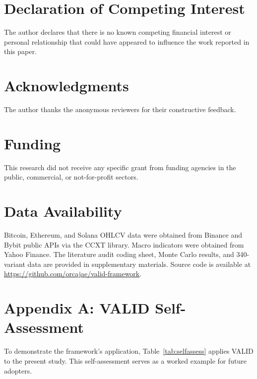\documentclass[preprint,12pt,authoryear]{elsarticle}
\begin{document}
\section*{Declaration of Competing Interest}

The author declares that there is no known competing financial interest or personal relationship that could have appeared to influence the work reported in this paper.

\section*{Acknowledgments}

The author thanks the anonymous reviewers for their constructive feedback.

\section*{Funding}

This research did not receive any specific grant from funding agencies in the public, commercial, or not-for-profit sectors.

\section*{Data Availability}

Bitcoin, Ethereum, and Solana OHLCV data were obtained from Binance and Bybit public APIs via the CCXT library. Macro indicators were obtained from Yahoo Finance. The literature audit coding sheet, Monte Carlo results, and 340-variant data are provided in supplementary materials. Source code is available at \url{https://github.com/orcajae/valid-framework}.

\section*{Appendix A: VALID Self-Assessment}

To demonstrate the framework's application, Table~\ref{tab:selfassess} applies VALID to the present study. This self-assessment serves as a worked example for future adopters.
\end{document}
